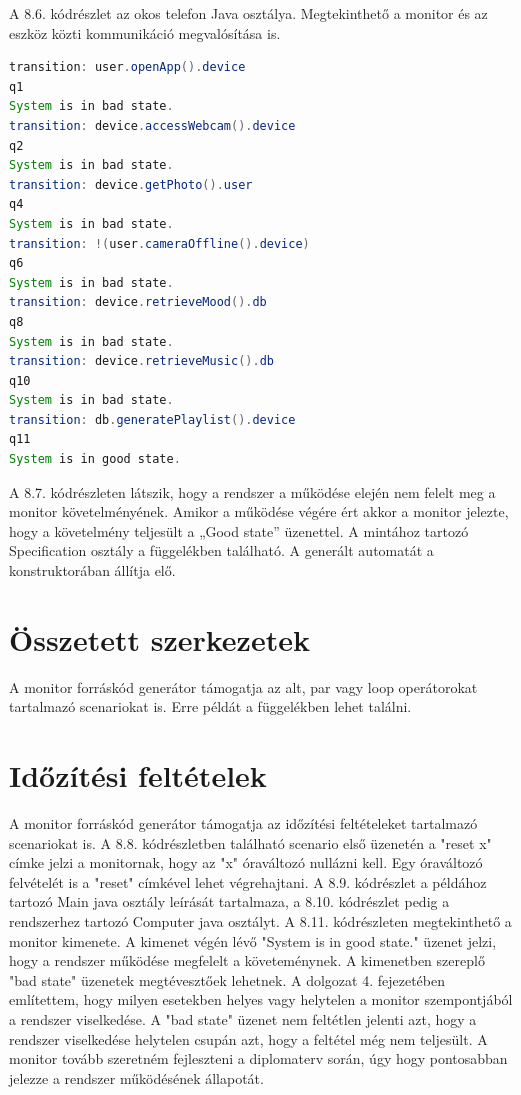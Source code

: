 A 8.6. kódrészlet az okos telefon Java osztálya.
Megtekinthető a monitor és az eszköz közti kommunikáció megvalósítása is.

\begin{lstlisting}[language=java, frame=single, float=ht!, caption={Monitor kimenete a rendszer működésének egyes fázisaiban.},captionpos=b]
transition: user.openApp().device
q1
System is in bad state.
transition: device.accessWebcam().device
q2
System is in bad state.
transition: device.getPhoto().user
q4
System is in bad state.
transition: !(user.cameraOffline().device)
q6
System is in bad state.
transition: device.retrieveMood().db
q8
System is in bad state.
transition: device.retrieveMusic().db
q10
System is in bad state.
transition: db.generatePlaylist().device
q11
System is in good state.
\end{lstlisting}

A 8.7. kódrészleten látszik, hogy a rendszer a működése elején nem felelt meg a monitor követelményének.
Amikor a működése végére ért akkor a monitor jelezte, hogy a követelmény teljesült a „Good state” üzenettel.
A mintához tartozó Specification osztály a függelékben található.
A generált automatát a konstruktorában állítja elő.

\section{Összetett szerkezetek}

A monitor forráskód generátor támogatja az alt, par vagy loop operátorokat tartalmazó scenariokat is.
Erre példát a függelékben lehet találni.

\clearpage\section{Időzítési feltételek}

A monitor forráskód generátor támogatja az időzítési feltételeket tartalmazó scenariokat is.
A 8.8. kódrészletben található scenario első üzenetén a "reset x" címke jelzi a monitornak, hogy az "x" óraváltozó nullázni kell.
Egy óraváltozó felvételét is a "reset" címkével lehet végrehajtani.
A 8.9. kódrészlet a példához tartozó Main java osztály leírását tartalmaza, a 8.10. kódrészlet pedig a rendszerhez tartozó Computer java osztályt.
A 8.11. kódrészleten megtekinthető a monitor kimenete.
A kimenet végén lévő "System is in good state." üzenet jelzi, hogy a rendszer működése megfelelt a követeménynek.
A kimenetben szereplő "bad state" üzenetek megtévesztőek lehetnek.
A dolgozat 4. fejezetében említettem, hogy milyen esetekben helyes vagy helytelen a monitor szempontjából a rendszer viselkedése.
A "bad state" üzenet nem feltétlen jelenti azt, hogy a rendszer viselkedése helytelen csupán azt, hogy a feltétel még nem teljesült.
A monitor tovább szeretném fejleszteni a diplomaterv során, úgy hogy pontosabban jelezze a rendszer működésének állapotát.

